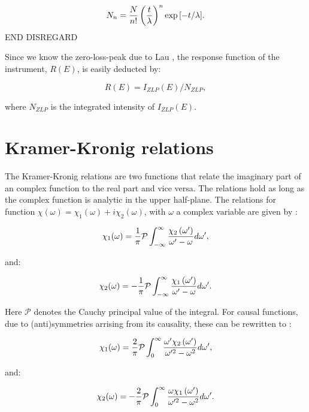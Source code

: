 \documentclass[12pt,a4paper]{article}
\def\frac#1#2{{{#1}\over {#2}}}
\numberwithin{equation}{section}
\numberwithin{figure}{section}
\numberwithin{table}{section}
\begin{document}
\begin{equation}
    N_n =  \frac{N}{n!} \left(\frac{t}{\lambda}\right)^n \exp{[-t/\lambda]} .
\end{equation}
END DISREGARD

Since we know the zero-loss-peak due to Lau \cite{lau}, the response function of the instrument, $R(E)$, is easily deducted by:

\begin{equation}
    R(E) = I_{ZLP}(E)/N_{ZLP},
\end{equation}

where $N_{ZLP}$ is the integrated intensity of $I_{ZLP}(E)$.


\section{Kramer-Kronig relations}
The Kramer-Kronig relations are two functions that relate the imaginary part of an complex function to the real part and vice versa. The relations hold as long as the complex function is analytic in the upper half-plane.
The relations for function $\chi(\omega)=\chi_{1}(\omega)+i \chi_{2}(\omega)$, with $\omega$ a complex variable are given by \cite{wikipedia_2020}:

\begin{equation}
    \chi_{1}(\omega)=\frac{1}{\pi} \mathcal{P} \int_{-\infty}^{\infty} \frac{\chi_{2}\left(\omega^{\prime}\right)}{\omega^{\prime}-\omega} d \omega^{\prime},
\end{equation}

and:

\begin{equation}
    \chi_{2}(\omega)=-\frac{1}{\pi} \mathcal{P} \int_{-\infty}^{\infty} \frac{\chi_{1}\left(\omega^{\prime}\right)}{\omega^{\prime}-\omega} d \omega^{\prime}.
\end{equation}

Here $\mathcal{P}$ denotes the Cauchy principal value of the integral. For causal functions, due to (anti)symmetries arrising from its causality, these can be rewritten to \cite{wikipedia_2020}:

\begin{equation}\label{eq_ch1_1}
    \chi_{1}(\omega)=\frac{2}{\pi} \mathcal{P} \int_{0}^{\infty} \frac{\omega^{\prime} \chi_{2}\left(\omega^{\prime}\right)}{\omega^{\prime 2}-\omega^{2}} d \omega^{\prime},
\end{equation}

and:

\begin{equation}
    \chi_{2}(\omega)=-\frac{2}{\pi} \mathcal{P} \int_{0}^{\infty} \frac{\omega \chi_{1}\left(\omega^{\prime}\right)}{\omega^{\prime 2}-\omega^{2}} d \omega^{\prime}.
\end{equation}
\end{document}
